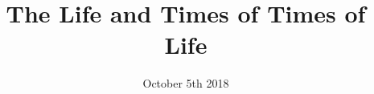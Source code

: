 \documentclass{beamer}
\title{The Life and Times of Times of Life}
\date[ISPN ’80]{October 5th 2018}
\begin{document}
\begin{frame}
\titlepage
\end{frame}
\end{document}
